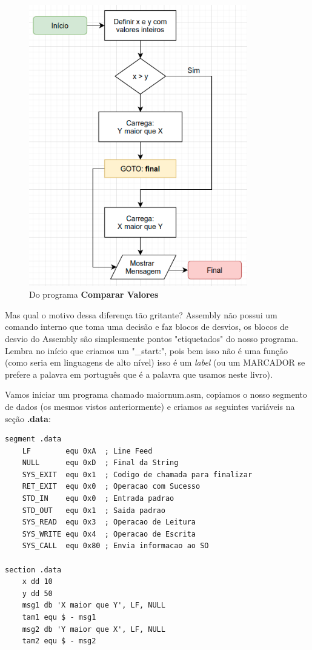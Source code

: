 \begin{figure}[ht]
\begin{minipage}[b]{0.45\linewidth}
		\includegraphics[width=0.85\textwidth]{Pictures/cap01/programa13}
		\caption{Do programa \textbf{Comparar Valores}}
	\end{minipage}
\end{figure}

Mas qual o motivo dessa diferença tão gritante? Assembly não possui um comando interno que toma uma decisão e faz blocos de desvios, os blocos de desvio do Assembly são simplesmente pontos "etiquetados" do nosso programa. Lembra no início que criamos um "\_start:", pois bem isso não é uma função (como seria em linguagens de alto nível) isso é um \textit{label} (ou um MARCADOR se prefere a palavra em português que é a palavra que usamos neste livro).

Vamos iniciar um programa chamado maiornum.asm, copiamos o nosso segmento de dados (os mesmos vistos anteriormente) e criamos as seguintes variáveis na seção \textbf{.data}:
\begin{lstlisting}[]
segment .data
	LF        equ 0xA  ; Line Feed
	NULL      equ 0xD  ; Final da String
	SYS_EXIT  equ 0x1  ; Codigo de chamada para finalizar
	RET_EXIT  equ 0x0  ; Operacao com Sucesso
	STD_IN    equ 0x0  ; Entrada padrao
	STD_OUT   equ 0x1  ; Saida padrao
	SYS_READ  equ 0x3  ; Operacao de Leitura
	SYS_WRITE equ 0x4  ; Operacao de Escrita
	SYS_CALL  equ 0x80 ; Envia informacao ao SO

section .data
	x dd 10
	y dd 50
	msg1 db 'X maior que Y', LF, NULL
	tam1 equ $ - msg1
	msg2 db 'Y maior que X', LF, NULL
	tam2 equ $ - msg2
\end{lstlisting}

